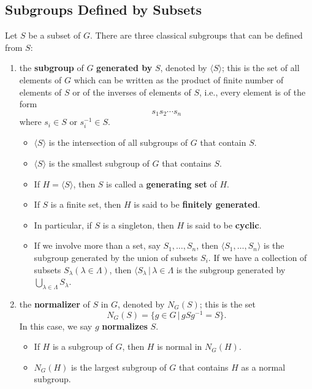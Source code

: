 \subsection*{Subgroups Defined by Subsets}
Let $S$ be a subset of $G$. There are three classical subgroups that can be defined from $S$:
\begin{enumerate}[(1)]
	\item the \textbf{subgroup} of $G$ \textbf{generated by} $S$, denoted by $\langle S\rangle$; this is the set of all elements of $G$ which can be written as the product of finite number of elements of $S$ or of the inverses of elements of $S$, i.e., every element is of the form
	\begin{equation*}
		s_1s_2\cdots s_n
	\end{equation*}
	where $s_i\in S$ or $s_i^{-1}\in S$. 
	\begin{itemize}
		\item $\langle S\rangle$ is the intersection of all subgroups of $G$ that contain $S$.
		\item $\langle S\rangle$ is the smallest subgroup of $G$ that contains $S$.
		\item If $H = \langle S\rangle$, then  $S$ is called a \textbf{generating set} of $H$. 
		\item If $S$ is a finite set, then $H$ is said to be \textbf{finitely generated}.
		\item  In particular, if $S$ is a singleton, then $H$ is said to be \textbf{cyclic}.
		\item If we involve more than a set, say $S_1,\dots, S_n$, then $\langle S_1,\dots, S_n\rangle$ is the subgroup generated by the union of subsets $S_i$. If we have a collection of subsets $S_\lambda (\lambda\in \Lambda)$, then $\langle S_\lambda \,|\, \lambda\in \Lambda$ is the subgroup generated by $\bigcup_{\lambda\in \Lambda} S_\lambda$.
	\end{itemize}
	\item the \textbf{normalizer} of $S$ in $G$, denoted by $N_G(S)$; this is the set
	\begin{equation*}
		N_G(S) = \{g\in G\,|\, gSg^{-1}= S\}.
	\end{equation*}
	In this case, we say $g$ \textbf{normalizes} $S$.
	\begin{itemize}
		\item If $H$ is a subgroup of $G$, then $H$ is normal in $	N_G(H)$.
		\item $N_G(H)$ is the largest subgroup of $G$ that contains $H$ as a normal subgroup.

\end{itemize}
\end{enumerate}
